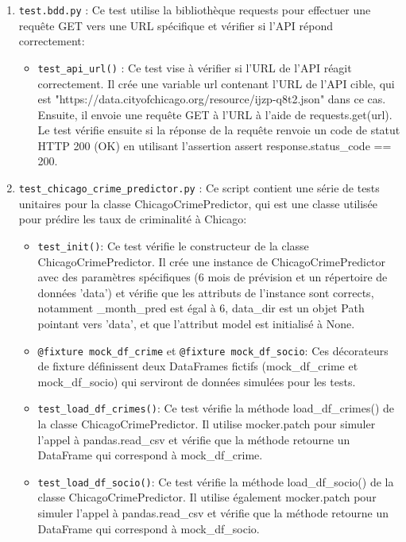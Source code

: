 \documentclass[12pt]{article}
\begin{document}
\begin{enumerate}
	\item \texttt{test.bdd.py} : Ce test utilise la bibliothèque requests pour effectuer une requête GET vers une URL spécifique et vérifier si l'API répond correctement:
	\begin{itemize}
		\item \texttt{test\_api\_url()} : Ce test vise à vérifier si l'URL de l'API réagit correctement. Il crée une variable url contenant l'URL de l'API cible, qui est "https://data.cityofchicago.org/resource/ijzp-q8t2.json" dans ce cas. Ensuite, il envoie une requête GET à l'URL à l'aide de requests.get(url). Le test vérifie ensuite si la réponse de la requête renvoie un code de statut HTTP 200 (OK) en utilisant l'assertion assert response.status\_code == 200.
	\end{itemize}
	
	\item \texttt{test\_chicago\_crime\_predictor.py} : Ce script contient une série de tests unitaires pour la classe ChicagoCrimePredictor, qui est une classe utilisée pour prédire les taux de criminalité à Chicago:
	\begin{itemize}
		\item \texttt{test\_init()}: Ce test vérifie le constructeur de la classe ChicagoCrimePredictor. Il crée une instance de ChicagoCrimePredictor avec des paramètres spécifiques (6 mois de prévision et un répertoire de données 'data') et vérifie que les attributs de l'instance sont corrects, notamment \_month\_pred est égal à 6, data\_dir est un objet Path pointant vers 'data', et que l'attribut model est initialisé à None.
		
		\item \texttt{@fixture mock\_df\_crime} et \texttt{@fixture mock\_df\_socio}: Ces décorateurs de fixture définissent deux DataFrames fictifs (mock\_df\_crime et mock\_df\_socio) qui serviront de données simulées pour les tests.
		
		\item \texttt{test\_load\_df\_crimes()}: Ce test vérifie la méthode load\_df\_crimes() de la classe ChicagoCrimePredictor. Il utilise mocker.patch pour simuler l'appel à pandas.read\_csv et vérifie que la méthode retourne un DataFrame qui correspond à mock\_df\_crime.
		
		\item \texttt{test\_load\_df\_socio()}: Ce test vérifie la méthode load\_df\_socio() de la classe ChicagoCrimePredictor. Il utilise également mocker.patch pour simuler l'appel à pandas.read\_csv et vérifie que la méthode retourne un DataFrame qui correspond à mock\_df\_socio.
		

\end{itemize}
\end{enumerate}
\end{document}
